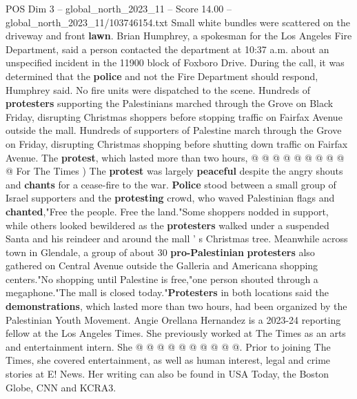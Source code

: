 \begin{textsample}{POS Dim 3 – global\_north\_2023\_11 – Score 14.00 – global\_north\_2023\_11/103746154.txt}
Small white bundles were scattered on the driveway and front \textbf{lawn}.
Brian Humphrey, a spokesman for the Los Angeles Fire Department, said a person contacted the department at 10:37 a.m. about an unspecified incident in the 11900 block of Foxboro Drive.
During the call, it was determined that the \textbf{police} and not the Fire Department should respond, Humphrey said.
No fire units were dispatched to the scene.
Hundreds of \textbf{protesters} supporting the Palestinians marched through the Grove on Black Friday, disrupting Christmas shoppers before stopping traffic on Fairfax Avenue outside the mall.
Hundreds of supporters of Palestine march through the Grove on Friday, disrupting Christmas shopping before shutting down traffic on Fairfax Avenue.
The \textbf{protest}, which lasted more than two hours, @ @ @ @ @ @ @ @ @ @ For The Times ) The \textbf{protest} was largely \textbf{peaceful} despite the angry shouts and \textbf{chants} for a cease-fire to the war. \textbf{Police} stood between a small group of Israel supporters and the \textbf{protesting} crowd, who waved Palestinian flags and \textbf{chanted},"Free the people.
Free the land."Some shoppers nodded in support, while others looked bewildered as the \textbf{protesters} walked under a suspended Santa and his reindeer and around the mall ' s Christmas tree.
Meanwhile across town in Glendale, a group of about 30 \textbf{pro-Palestinian} \textbf{protesters} also gathered on Central Avenue outside the Galleria and Americana shopping centers."No shopping until Palestine is free,"one person shouted through a megaphone."The mall is closed today."\textbf{Protesters} in both locations said the \textbf{demonstrations}, which lasted more than two hours, had been organized by the Palestinian Youth Movement.
Angie Orellana Hernandez is a 2023-24 reporting fellow at the Los Angeles Times.
She previously worked at The Times as an arts and entertainment intern.
She @ @ @ @ @ @ @ @ @ @.
Prior to joining The Times, she covered entertainment, as well as human interest, legal and crime stories at E!
News.
Her writing can also be found in USA Today, the Boston Globe, CNN and KCRA3.

\end{textsample}
